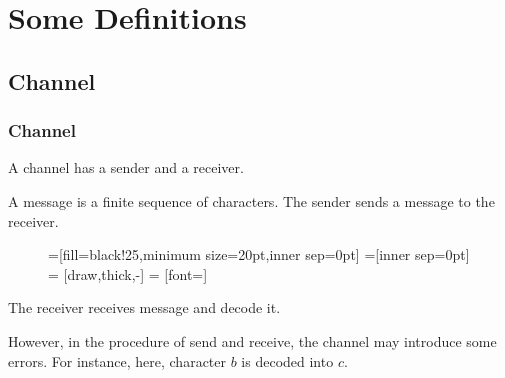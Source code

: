 \section{Some Definitions}


\subsection{Channel}

      \begin{frame}
            \frametitle{Channel}
            \begin{definition}[channel]
                  A channel has a sender and a receiver.
                  \pause


                  A message is a finite sequence of characters.
                  The sender sends a message to the receiver.
                  \begin{figure}[h!]
                        =[fill=black!25,minimum size=20pt,inner sep=0pt]
                        =[inner sep=0pt]
                         = [draw,thick,-]
                         = [font=\small]
                  \end{figure}
                  \pause
                  
                  The receiver receives message and decode it.
                  \pause

                  However, in the procedure of send and receive, the channel may introduce some errors. For instance, here, character $b$ is decoded into $c$. 
            \end{definition}
      \end{frame}

